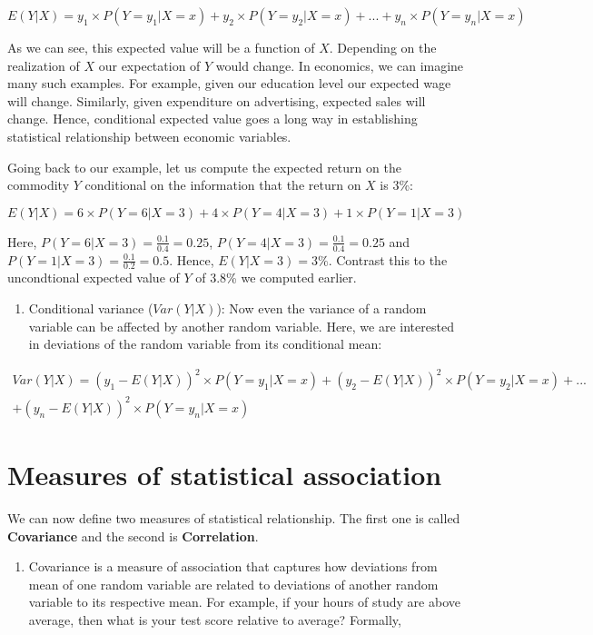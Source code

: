 \documentclass[]{book}
\providecommand{\tightlist}{%
  \setlength{\itemsep}{0pt}\setlength{\parskip}{0pt}}
\theoremstyle{definition}
\theoremstyle{definition}
\theoremstyle{definition}
\theoremstyle{remark}
\begin{document}
\[E(Y|X)=y_1 \times P(Y=y_1|X=x) + y_2 \times P(Y=y_2|X=x)+...+ y_n \times P(Y=y_n|X=x)\]

As we can see, this expected value will be a function of \(X\). Depending on the realization of \(X\) our expectation of \(Y\) would change. In economics, we can imagine many such examples. For example, given our education level our expected wage will change. Similarly, given expenditure on advertising, expected sales will change. Hence, conditional expected value goes a long way in establishing statistical relationship between economic variables.

Going back to our example, let us compute the expected return on the commodity \(Y\) conditional on the information that the return on \(X\) is 3\%:

\[E(Y|X) = 6 \times P(Y=6|X=3) + 4 \times P(Y=4|X=3) + 1 \times P(Y=1|X=3)\]

Here, \(P(Y=6|X=3)= \displaystyle\frac{0.1}{0.4}=0.25\), \(P(Y=4|X=3)= \displaystyle\frac{0.1}{0.4}=0.25\) and \(P(Y=1|X=3)= \displaystyle\frac{0.1}{0.2}=0.5\). Hence, \(E(Y|X=3)=3\%\). Contrast this to the uncondtional expected value of \(Y\) of 3.8\% we computed earlier.

\begin{enumerate}
\def\labelenumi{\arabic{enumi}.}
\setcounter{enumi}{1}
\tightlist
\item
  Conditional variance (\(Var(Y|X)\)): Now even the variance of a random variable can be affected by another random variable. Here, we are interested in deviations of the random variable from its conditional mean:
\end{enumerate}

\begin{align}
Var(Y|X) = (y_1 -E(Y|X))^2 \times P(Y=y_1|X=x) + (y_2 -E(Y|X))^2\times P(Y=y_2|X=x)+...\\ \nonumber
+ (y_n -E(Y|X))^2 \times P(Y=y_n|X=x)
\end{align}

\hypertarget{measures-of-statistical-association}{%
\section{Measures of statistical association}\label{measures-of-statistical-association}}

We can now define two measures of statistical relationship. The first one is called \textbf{Covariance} and the second is \textbf{Correlation}.

\begin{enumerate}
\def\labelenumi{\arabic{enumi}.}
\tightlist
\item
  Covariance is a measure of association that captures how deviations from mean of one random variable are related to deviations of another random variable to its respective mean. For example, if your hours of study are above average, then what is your test score relative to average? Formally,
\end{enumerate}
\end{document}
